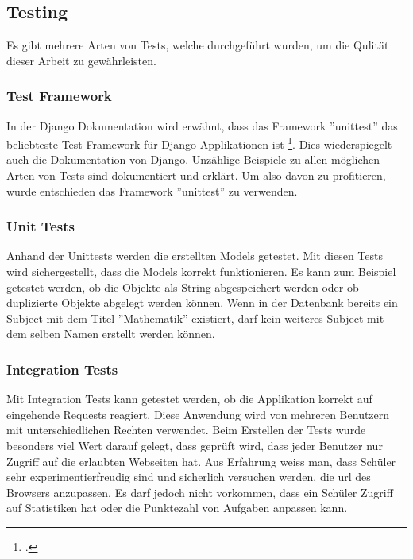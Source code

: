 \subsection{Testing}
Es gibt mehrere Arten von Tests, welche durchgeführt wurden, um die Qulität dieser Arbeit zu gewährleisten.

\subsubsection*{Test Framework}
In der Django Dokumentation wird erwähnt, dass das Framework ''unittest'' das beliebteste Test Framework für Django Applikationen ist \footcite{writing_tests}. Dies wiederspiegelt auch die Dokumentation von Django. Unzählige Beispiele zu allen möglichen Arten von Tests sind dokumentiert und erklärt. Um also davon zu profitieren, wurde entschieden das Framework ''unittest'' zu verwenden.

\subsubsection{Unit Tests}
Anhand der Unittests werden die erstellten Models getestet. Mit diesen Tests wird sichergestellt, dass die Models korrekt funktionieren. Es kann zum Beispiel getestet werden, ob die Objekte als String abgespeichert werden oder ob duplizierte Objekte abgelegt werden können. Wenn in der Datenbank bereits ein Subject mit dem Titel ''Mathematik'' existiert, darf kein weiteres Subject mit dem selben Namen erstellt werden können.


\subsubsection{Integration Tests}
Mit Integration Tests kann getestet werden, ob die Applikation korrekt auf eingehende Requests reagiert. Diese Anwendung wird von mehreren Benutzern mit unterschiedlichen Rechten verwendet. Beim Erstellen der Tests wurde besonders viel Wert darauf gelegt, dass geprüft wird, dass jeder Benutzer nur Zugriff auf die erlaubten Webseiten hat. Aus Erfahrung weiss man, dass Schüler sehr experimentierfreudig sind und sicherlich versuchen werden, die \gls{url} des Browsers anzupassen. Es darf jedoch nicht vorkommen, dass ein Schüler Zugriff auf Statistiken hat oder die Punktezahl von Aufgaben anpassen kann.


